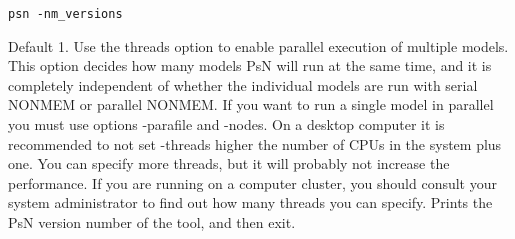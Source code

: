 \begin{optionlist}
\begin{verbatim}
psn -nm_versions
\end{verbatim}
\nextopt
{}
Default 1. Use the threads option to enable parallel execution of multiple models.
This option decides how many models PsN will run at the same time, and it is completely
independent of whether the individual models are run with serial NONMEM or parallel NONMEM.
If you want to run a single model in parallel you must use options -parafile and -nodes.
On a desktop computer it 
is recommended to not set -threads higher the number of CPUs in the system plus one. 
You can specify more threads, 
but it will probably not increase the performance. If you are running on a computer cluster, 
you should consult your 
system administrator to find out how many threads you can specify. 
\nextopt
{}
Prints the PsN version number of the tool, and then exit. 
\nextopt
\end{optionlist}
